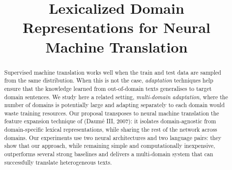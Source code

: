 \documentclass[a4paper]{article}
\title{Lexicalized Domain Representations for Neural Machine Translation}
\begin{document}
\maketitle
%
\begin{abstract}
  Supervised machine translation works well when the train and test data are sampled from the same distribution.
  When this is not the case, \emph{adaptation} techniques help ensure that the knowledge learned from out-of-domain texts generalises to target domain sentences.
  We study here a related setting, \emph{multi-domain adaptation}, where the number of domains is potentially large and adapting separately to each domain would waste training resources.
  Our proposal transposes to neural machine translation the feature expansion technique of (Daum\'e III, 2007): it isolates domain-agnostic from domain-specific lexical representations, while sharing the rest of the network across domains.
  Our experiments use two neural architectures and two language pairs: they show that our approach, while remaining simple and computationally inexpensive, outperforms several strong baselines and delivers a multi-domain system that can successfully translate heterogeneous texts.
\end{abstract}
\end{document}
